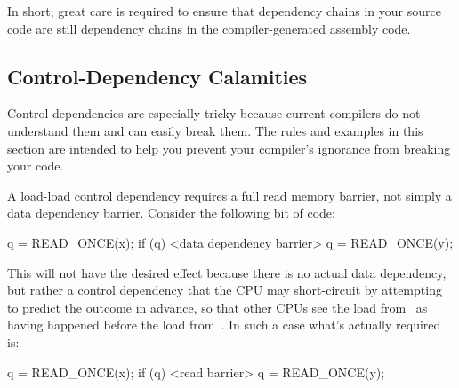 \QuickQuizEnd

In short, great care is required to ensure that dependency
chains in your source code are still dependency chains in the
compiler-generated assembly code.

\subsection{Control-Dependency Calamities}
\label{sec:memorder:Control-Dependency Calamities}

Control dependencies are especially tricky because current compilers
do not understand them and can easily break them.
The rules and examples in this section are intended to help you
prevent your compiler's ignorance from breaking your code.

A load-load control dependency requires a full read memory barrier,
not simply a data dependency barrier.
Consider the following bit of code:

\begin{VerbatimN}
q = READ_ONCE(x);
if (q) {
	<data dependency barrier>
	q = READ_ONCE(y);
}
\end{VerbatimN}

This will not have the desired effect because there is no actual data
dependency, but rather a control dependency that the CPU may short-circuit
by attempting to predict the outcome in advance, so that other CPUs see
the load from~ as having happened before the load from~.
In such a case what's actually required is:

\begin{VerbatimN}
q = READ_ONCE(x);
if (q) {
	<read barrier>
	q = READ_ONCE(y);
}
\end{VerbatimN}

